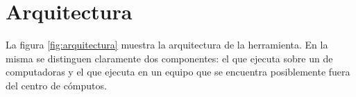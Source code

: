 
\section{Arquitectura}

La figura \ref{fig:arquitectura} muestra la arquitectura de la herramienta. En
la misma se distinguen claramente dos componentes: el \bend que ejecuta sobre
un \cluster de computadoras y el \fend que ejecuta en un equipo que se
encuentra posiblemente fuera del centro de cómputos.

